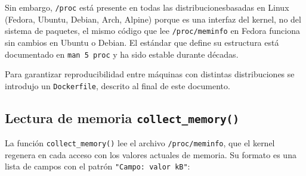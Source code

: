\documentclass[12pt,letterpaper]{article}
\begin{document}
\medskip

Sin embargo, \texttt{/proc} está presente en todas las distribucionesbasadas en Linux (Fedora, Ubuntu, Debian, Arch, Alpine) porque es una interfaz del kernel, no del sistema de paquetes, el mismo código que lee \texttt{/proc/meminfo} en Fedora funciona sin cambios en Ubuntu o Debian. El estándar que define su estructura está
documentado en \texttt{man 5 proc} y ha sido estable durante décadas.

\medskip

Para garantizar reproducibilidad entre máquinas con distintas distribuciones se introdujo un
\texttt{Dockerfile}, descrito al final de este documento.

\subsection*{Lectura de memoria \texttt{collect\_memory()}}
La función \texttt{collect\_memory()} lee el archivo \texttt{/proc/meminfo}, que el kernel regenera en cada
acceso con los valores actuales de memoria. Su formato es una lista de campos con el patrón \texttt{"Campo: valor kB"}:
\end{document}
